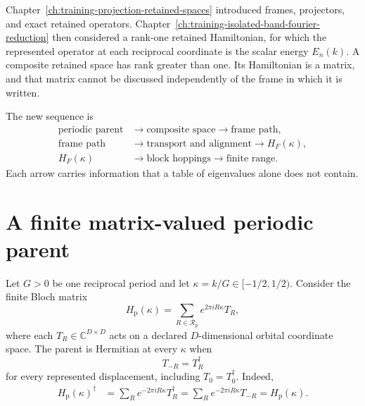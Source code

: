 Chapter~\ref{ch:training-projection-retained-spaces} introduced frames,
projectors, and exact retained operators. Chapter~\ref{ch:training-isolated-band-fourier-reduction}
then considered a rank-one retained Hamiltonian, for which the represented
operator at each reciprocal coordinate is the scalar energy $E_n(k)$. A
composite retained space has rank greater than one. Its Hamiltonian is a matrix,
and that matrix cannot be discussed independently of the frame in which it is
written.

The new sequence is
\begin{equation}
  \begin{aligned}
    \text{periodic parent}
    &\longrightarrow \text{composite space}
     \longrightarrow \text{frame path},\\
    \text{frame path}
    &\longrightarrow \text{transport and alignment}
     \longrightarrow H_F(\kappa),\\
    H_F(\kappa)
    &\longrightarrow \text{block hoppings}
     \longrightarrow \text{finite range}.
  \end{aligned}
  \label{eq:training-composite-sequence}
\end{equation}
Each arrow carries information that a table of eigenvalues alone does not
contain.

\section{A finite matrix-valued periodic parent}

Let $G>0$ be one reciprocal period and let
$\kappa=k/G\in[-1/2,1/2)$. Consider the finite Bloch matrix
\begin{equation}
  H_{\mathrm p}(\kappa)
  =\sum_{R\in\mathcal R_{\mathrm p}}
    e^{2\pi iR\kappa}T_R,
  \label{eq:training-composite-parent}
\end{equation}
where each $T_R\in\mathbb C^{D\times D}$ acts on a declared $D$-dimensional
orbital coordinate space. The parent is Hermitian at every $\kappa$ when
\begin{equation}
  T_{-R}=T_R^{\dagger}
  \label{eq:training-composite-parent-hermiticity}
\end{equation}
for every represented displacement, including $T_0=T_0^{\dagger}$. Indeed,
\begin{align}
  H_{\mathrm p}(\kappa)^{\dagger}
  &=\sum_R e^{-2\pi iR\kappa}T_R^{\dagger}
    =\sum_R e^{-2\pi iR\kappa}T_{-R}
    =H_{\mathrm p}(\kappa).
  \label{eq:training-composite-fiber-hermiticity}
\end{align}

